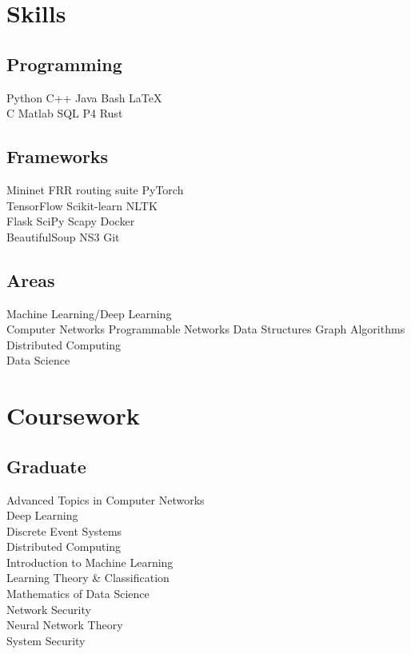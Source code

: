 \documentclass[]{onepage}
\begin{document}
\begin{minipage}[t]{0.33\textwidth}
\section{Skills}
\subsection{Programming}
Python \textbullet{} C++ \textbullet{} Java \textbullet{} Bash \textbullet{} \LaTeX\  \\ 
C \textbullet{} Matlab \textbullet{} SQL \textbullet{} P4 \textbullet{} Rust \\ 
\vspace{0.1cm}
\subsection{Frameworks}
Mininet \textbullet{} FRR routing suite \textbullet{} PyTorch \\ \textbullet{} TensorFlow \textbullet{}Scikit-learn \textbullet{} NLTK \\ \textbullet{} Flask \textbullet{} SciPy \textbullet{} Scapy \textbullet{} Docker\\ \textbullet{} BeautifulSoup \textbullet{} NS3 \textbullet{} Git
\vspace{0.1cm}
\subsection{Areas}
\textbullet{} Machine Learning/Deep Learning \\ \textbullet{} Computer Networks \textbullet{} Programmable Networks \textbullet{} Data Structures \textbullet{} Graph Algorithms \textbullet{} Distributed Computing \\ \textbullet{} Data Science


\section{Coursework}
\subsection{Graduate}
Advanced Topics in Computer Networks \\
Deep Learning \\
Discrete Event Systems \\
Distributed Computing \\
Introduction to Machine Learning \\
Learning Theory \& Classification \\
Mathematics of Data Science \\
Network Security \\
Neural Network Theory \\
System Security \\
\vspace{0.1cm}

\end{minipage}
\end{document}
